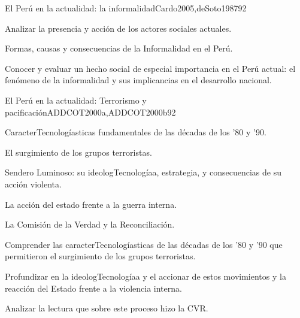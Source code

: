 \begin{syllabus}
\begin{unit}{El Perú en la actualidad: la informalidad}{Cardo2005,deSoto1987}{9}{2}
\begin{topics}
      \item Analizar la presencia y acción de los actores sociales actuales.
      \item Formas, causas y consecuencias de la Informalidad en el Perú.
\end{topics}

\begin{unitgoals}
      \item Conocer y evaluar un hecho social de especial importancia en el Perú actual: el fenómeno de la informalidad y sus implicancias en el desarrollo nacional.
\end{unitgoals}
\end{unit}

\begin{unit}{El Perú en la actualidad: Terrorismo y pacificación}{ADDCOT2000a,ADDCOT2000b}{9}{2}
\begin{topics}
      \item CaracterTecnologíasticas fundamentales de las décadas de los '80 y '90.
      \item El surgimiento de los grupos terroristas.
      \item Sendero Luminoso: su ideologTecnologíaa, estrategia, y consecuencias de su acción violenta.
      \item La acción del estado frente a la guerra interna.
      \item La Comisión de la Verdad y la Reconciliación.
\end{topics}
\begin{unitgoals}
      \item Comprender las caracterTecnologíasticas de las décadas de los '80 y '90 que permitieron el surgimiento de los grupos terroristas.
      \item Profundizar en la ideologTecnologíaa y el accionar de estos movimientos y la reacción del Estado frente a la violencia interna.
      \item Analizar la lectura que sobre este proceso hizo la CVR.
\end{unitgoals}
\end{unit}

\begin{coursebibliography}
\end{coursebibliography}

\end{syllabus}

%
